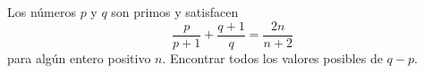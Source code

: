 Los números $p$ y $q$ son primos y satisfacen 
\[\frac{p}{{p + 1}} + \frac{{q + 1}}{q} = \frac{{2n}}{{n + 2}}\]
para algún entero positivo $n$. Encontrar todos los valores posibles de $q-p$.